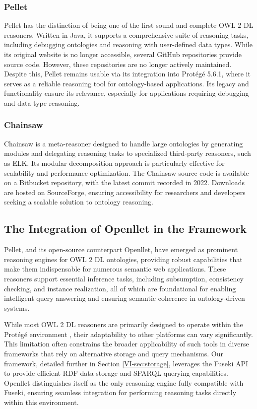 \subsubsection{Pellet}
Pellet \cite{sirinPelletPracticalOWLDL2007} has the distinction of being one of the first sound and complete OWL 2 DL reasoners. Written in Java, it supports a comprehensive suite of reasoning tasks, including debugging ontologies and reasoning with user-defined data types. While its original website is no longer accessible, several GitHub repositories provide source code. However, these repositories are no longer actively maintained. Despite this, Pellet remains usable via its integration into Protégé 5.6.1, where it serves as a reliable reasoning tool for ontology-based applications. Its legacy and functionality ensure its relevance, especially for applications requiring debugging and data type reasoning.

\subsubsection{Chainsaw}
Chainsaw \cite{tsarkovChainsawMetareasonerLarge} is a meta-reasoner designed to handle large ontologies by generating modules and delegating reasoning tasks to specialized third-party reasoners, such as ELK. Its modular decomposition approach is particularly effective for scalability and performance optimization. The Chainsaw source code is available on a Bitbucket repository, with the latest commit recorded in 2022. Downloads are hosted on SourceForge, ensuring accessibility for researchers and developers seeking a scalable solution to ontology reasoning.

\subsection{The Integration of Openllet in the Framework}

Pellet, and its open-source counterpart Openllet, have emerged as prominent reasoning engines for OWL 2 DL ontologies, providing robust capabilities that make them indispensable for numerous semantic web applications. These reasoners support essential inference tasks, including subsumption, consistency checking, and instance realization, all of which are foundational for enabling intelligent query answering and ensuring semantic coherence in ontology-driven systems.

While most OWL 2 DL reasoners are primarily designed to operate within the Protégé environment \cite{musenProtegeProject2015}, their adaptability to other platforms can vary significantly. This limitation often constrains the broader applicability of such tools in diverse frameworks that rely on alternative storage and query mechanisms. Our framework, detailed further in Section \ref{VI-sec:storage}, leverages the Fuseki API to provide efficient RDF data storage and SPARQL querying capabilities. Openllet distinguishes itself as the only reasoning engine fully compatible with Fuseki, ensuring seamless integration for performing reasoning tasks directly within this environment. 

